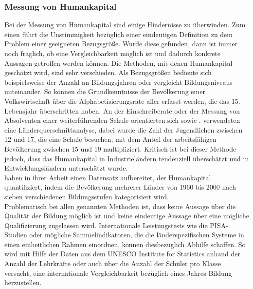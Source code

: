 \subsubsection{Messung von Humankapital}
%
Bei der Messung von Humankapital sind einige Hindernisse zu überwinden. Zum einen führt die Unstimmigkeit bezüglich einer eindeutigen Definition zu dem Problem einer geeigneten Bezugsgröße. Wurde diese gefunden, dann ist immer noch fraglich, ob eine Vergleichbarkeit möglich ist und dadurch konkrete Aussagen getroffen werden können. Die Methoden, mit denen Humankapital geschätzt wird, sind sehr verschieden. Als Bezugsgrößen bediente  \cite{Romer.} sich beispielsweise der Anzahl an Bildungsjahren oder vergleicht Bildungsniveaus miteinander. So können die Grundkenntnisse der Bevölkerung einer Volkswirtschaft über die Alphabetisierungsrate aller erfasst werden, die das 15. Lebensjahr überschritten haben. An der Einschreiberate oder der Messung von Absolventen einer weiterführenden Schule orientierten sich \cite{Levine.1992} sowie \cite{Barro.2001}. \cite{Mankiw.1992} verwendeten eine Länderquerschnittanalyse, dabei wurde die Zahl der Jugendlichen zwischen 12 und 17, die eine Schule besuchen, mit dem Anteil der arbeitsfähigen Bevölkerung zwischen 15 und 19 multipliziert. Kritisch ist bei dieser Methode jedoch, dass das Humankapital in Industrieländern tendenziell überschätzt und in Entwicklungsländern unterschätzt wurde.\\
%
\cite{Barro.2001} haben in ihrer Arbeit einen Datensatz aufbereitet, der Humankapital quantifiziert, indem die Bevölkerung mehrerer Länder von 1960 bis 2000 nach sieben verschiedenen Bildungsstufen kategorisiert wird.\\
%
Problematisch bei allen genannten Methoden ist, dass keine Aussage über die Qualität der Bildung möglich ist und keine eindeutige Aussage über eine mögliche Qualifizierung zugelassen wird. Internationale Leistungstests wie die PISA-Studien oder mögliche Sammel\-indikatoren, die die länderspezifischen Systeme in einen einheitlichen Rahmen einordnen, können diesbezüglich Abhilfe schaffen. So wird mit Hilfe der Daten aus dem UNESCO Institute for Statistics anhand der Anzahl der Lehrkräfte oder auch über die Anzahl der Schüler pro Klasse versucht, eine internationale Vergleichbarkeit  bezüglich eines Jahres Bildung herzustellen. 
\newpage
